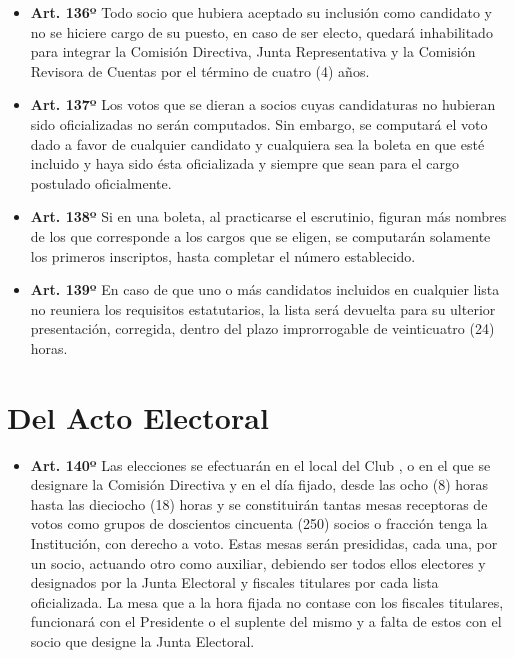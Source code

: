 \documentclass[]{book}
\providecommand{\tightlist}{%
  \setlength{\itemsep}{0pt}\setlength{\parskip}{0pt}}
\begin{document}
\begin{itemize}
\tightlist
\item
  \textbf{Art. 136º} Todo socio que hubiera aceptado su inclusión como
  candidato y no se hiciere cargo de su puesto, en caso de ser electo,
  quedará inhabilitado para integrar la Comisión Directiva, Junta
  Representativa y la Comisión Revisora de Cuentas por el término de
  cuatro (4) años.
\end{itemize}

\begin{itemize}
\tightlist
\item
  \textbf{Art. 137º} Los votos que se dieran a socios cuyas candidaturas
  no hubieran sido oficializadas no serán computados. Sin embargo, se
  computará el voto dado a favor de cualquier candidato y cualquiera sea
  la boleta en que esté incluido y haya sido ésta oficializada y siempre
  que sean para el cargo postulado oficialmente.
\end{itemize}

\begin{itemize}
\tightlist
\item
  \textbf{Art. 138º} Si en una boleta, al practicarse el escrutinio,
  figuran más nombres de los que corresponde a los cargos que se eligen,
  se computarán solamente los primeros inscriptos, hasta completar el
  número establecido.
\end{itemize}

\begin{itemize}
\tightlist
\item
  \textbf{Art. 139º} En caso de que uno o más candidatos incluidos en
  cualquier lista no reuniera los requisitos estatutarios, la lista será
  devuelta para su ulterior presentación, corregida, dentro del plazo
  improrrogable de veinticuatro (24) horas.
\end{itemize}

\section{Del Acto Electoral}\label{del-acto-electoral}

\begin{itemize}
\tightlist
\item
  \textbf{Art. 140º} Las elecciones se efectuarán en el local del Club ,
  o en el que se designare la Comisión Directiva y en el día fijado,
  desde las ocho (8) horas hasta las dieciocho (18) horas y se
  constituirán tantas mesas receptoras de votos como grupos de
  doscientos cincuenta (250) socios o fracción tenga la Institución, con
  derecho a voto. Estas mesas serán presididas, cada una, por un socio,
  actuando otro como auxiliar, debiendo ser todos ellos electores y
  designados por la Junta Electoral y fiscales titulares por cada lista
  oficializada. La mesa que a la hora fijada no contase con los fiscales
  titulares, funcionará con el Presidente o el suplente del mismo y a
  falta de estos con el socio que designe la Junta Electoral.
\end{itemize}
\end{document}
